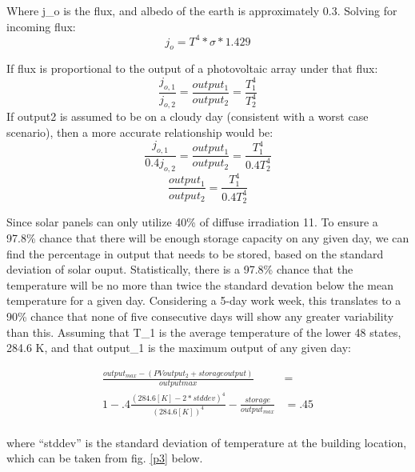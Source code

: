 Where j_o is the flux, and albedo of the earth is approximately 0.3. Solving for
incoming flux:
\begin{equation}
j_o=T^4*\sigma*1.429
\end{equation}

If flux is proportional to the output of a photovoltaic array under that flux:
\begin{equation}
\frac{j_{o,1}}{j_{o,2}}=\frac{output_1}{output_2}=\frac{T_1^4}{T_2^4}
\end{equation}
If output2 is assumed to be on a cloudy day (consistent with a worst case scenario), 
then a more accurate relationship would be:
\begin{equation}
\frac{j_{o,1}}{0.4j_{o,2}}=\frac{output_1}{output_2}=\frac{T_1^4}{0.4T_2^4}
\end{equation}
\begin{equation}
\frac{output_1}{output_2}=\frac{T_1^4}{0.4T_2^4}
\end{equation}

Since solar panels can only utilize 40\% of diffuse irradiation \cite{patrick}{11}. To ensure a
97.8\% chance that there will be enough storage capacity on any given day, we
can find the percentage in output that needs to be stored, based on the standard
deviation of solar ouput. Statistically, there is a 97.8\% chance that the temperature
will be no more than twice the standard devation below the mean temperature for a 
given day. Considering a 5-day work week, this translates to a 90\% chance that
none of five consecutive days will show any greater variability than this. Assuming that 
T_1 is the average temperature of the lower 48 states, 284.6 K, and that output_1 
is the maximum output of any given day:

\begin{equation}
\begin{aligned}
\frac{output_{max}-(PV output_2+storage output)}{outputmax} &= \\
1-.4\frac{(284.6[K]-2*stddev)^4}{(284.6[K])^4}-\frac{storage}{output_{max}}
&=.45
\\
\end{aligned}
\end{equation}
 
where ``stddev'' is the standard deviation of
temperature at the building location, which can be taken from fig. \ref{p3}
below.

